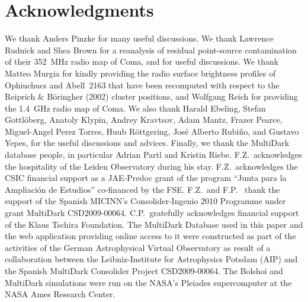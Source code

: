 \documentclass[useAMS,usenatbib]{mn2e}
\begin{document}
\section*{Acknowledgments}
We thank Anders Pinzke for many useful discussions. We thank Lawrence Rudnick
and Shea Brown for a reanalysis of residual point-source contamination of their
352~MHz radio map of Coma, and for useful discussions. We thank Matteo
Murgia for kindly providing the radio surface brightness profiles of Ophiuchucs
and Abell~2163 that have been recomputed with respect to the Reiprich \&
B\"{o}ringher (2002) cluster positions, and Wolfgang Reich for providing the
1.4~GHz radio map of Coma.  We also thank Harald Ebeling, Stefan Gottl{\"o}berg,
Anatoly Klypin, Andrey Kravtsov, Adam Mantz, Frazer Pearce, Miguel-Angel Perez
Torres, Huub R{\"o}ttgering, Jos\'e Alberto Rubi\~no, and Gustavo Yepes, for the
useful discussions and advices.  Finally, we thank the MultiDark database
people, in particular Adrian Partl and Kristin Riebe. 
%
F.Z.{\ }acknowledges the hospitality of the Leiden Observatory during his stay.
%
F.Z.{\ }acknowledges the
CSIC financial support as a JAE-Predoc grant of the program ``Junta para la
Ampliaci\'on de Estudios'' co-financed by the FSE. F.Z.{\ }and F.P.{\ } thank
the support of the Spanish MICINN's Consolider-Ingenio 2010 Programme under
grant MultiDark CSD2009-00064. C.P.{\ }gratefully acknowledges financial support
of the Klaus Tschira Foundation. The MultiDark Database used in this paper and
the web application providing online access to it were constructed as part of
the activities of the German Astrophysical Virtual Observatory as result of a
collaboration between the Leibniz-Institute for Astrophysics Potsdam (AIP) and
the Spanish MultiDark Consolider Project CSD2009-00064. The Bolshoi and
MultiDark simulations were run on the NASA's Pleiades supercomputer at the NASA
Ames Research Center.



%

\end{document}
